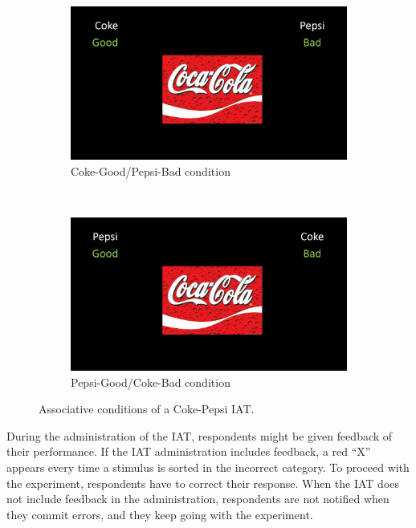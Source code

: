 \documentclass[12pt]{book}
\begin{document}
\begin{figure}[h!]
	\centering
	\begin{subfigure}[b]{0.4\linewidth}
		\includegraphics[width=\linewidth]{cocagood.png}
		\caption{Coke-Good/Pepsi-Bad condition}
		\label{cgpb}
	\end{subfigure}
	~ %
	\begin{subfigure}[b]{0.4\linewidth}
		\includegraphics[width=\linewidth]{cocabad.png}
		\caption{Pepsi-Good/Coke-Bad condition}
	\end{subfigure}
\caption{\label{fig:IAT} Associative conditions of a Coke-Pepsi IAT.}
\end{figure}



During the administration of the IAT, respondents might be given feedback of their performance. If the IAT administration includes feedback, a red ``X'' appears every time a stimulus is sorted in the incorrect category. To proceed with the experiment, respondents have to correct their response. When the IAT does not include feedback in the administration, respondents are not notified when they commit errors, and they keep going with the experiment. 
\end{document}
